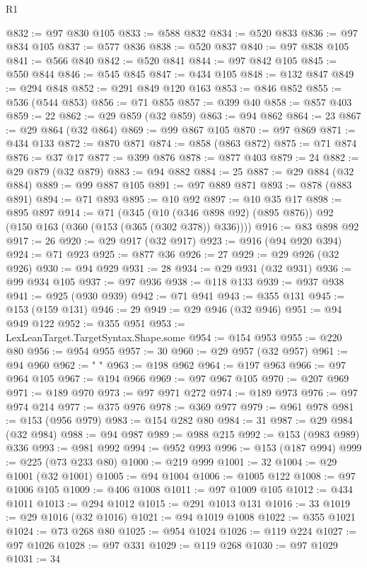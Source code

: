 \begin{lexlean}{R1}
\begin{coremodule}
@832 := @97 @830 @105
@833 := @588 @832
@834 := @520 @833
@836 := @97 @834 @105
@837 := @577 @836
@838 := @520 @837
@840 := @97 @838 @105
@841 := @566 @840
@842 := @520 @841
@844 := @97 @842 @105
@845 := @550 @844
@846 := @545 @845
@847 := @434 @105
@848 := @132 @847
@849 := @294 @848
@852 := @291 @849 @120 @163
@853 := @846 @852
@855 := @536 (@544 @853)
@856 := @71 @855
@857 := @399 @40
@858 := @857 @403
@859 := 22
@862 := @29 @859 (@32 @859)
@863 := @94 @862
@864 := 23
@867 := @29 @864 (@32 @864)
@869 := @99 @867 @105
@870 := @97 @869
@871 := @434 @133
@872 := @870 @871
@874 := @858 (@863 @872)
@875 := @71 @874
@876 := @37 @17
@877 := @399 @876
@878 := @877 @403
@879 := 24
@882 := @29 @879 (@32 @879)
@883 := @94 @882
@884 := 25
@887 := @29 @884 (@32 @884)
@889 := @99 @887 @105
@891 := @97 @889 @871
@893 := @878 (@883 @891)
@894 := @71 @893
@895 := @10 @92
@897 := @10 @35 @17
@898 := @895 @897
@914 := @71
    (@345 (@10 (@346 @898 @92) (@895 @876)) @92 (@150 @163 (@360 (@153 (@365 (@302 @378)) @336))))
@916 := @83 @898 @92
@917 := 26
@920 := @29 @917 (@32 @917)
@923 := @916 (@94 @920 @394)
@924 := @71 @923
@925 := @877 @36
@926 := 27
@929 := @29 @926 (@32 @926)
@930 := @94 @929
@931 := 28
@934 := @29 @931 (@32 @931)
@936 := @99 @934 @105
@937 := @97 @936
@938 := @118 @133
@939 := @937 @938
@941 := @925 (@930 @939)
@942 := @71 @941
@943 := @355 @131
@945 := @153 (@159 @131)
@946 := 29
@949 := @29 @946 (@32 @946)
@951 := @94 @949 @122
@952 := @355 @951
@953 := LexLeanTarget.TargetSyntax.Shape.some
@954 := @154 @953
@955 := @220 @80
@956 := @954 @955
@957 := 30
@960 := @29 @957 (@32 @957)
@961 := @94 @960
@962 := " "
@963 := @198 @962
@964 := @197 @963
@966 := @97 @964 @105
@967 := @194 @966
@969 := @97 @967 @105
@970 := @207 @969
@971 := @189 @970
@973 := @97 @971 @272
@974 := @189 @973
@976 := @97 @974 @214
@977 := @375 @976
@978 := @369 @977
@979 := @961 @978
@981 := @153 (@956 @979)
@983 := @154 @282 @80
@984 := 31
@987 := @29 @984 (@32 @984)
@988 := @94 @987
@989 := @988 @215
@992 := @153 (@983 @989) @336
@993 := @981 @992
@994 := @952 @993
@996 := @153 (@187 @994)
@999 := @225 (@73 @233 @80)
@1000 := @219 @999
@1001 := 32
@1004 := @29 @1001 (@32 @1001)
@1005 := @94 @1004
@1006 := @1005 @122
@1008 := @97 @1006 @105
@1009 := @406 @1008
@1011 := @97 @1009 @105
@1012 := @434 @1011
@1013 := @294 @1012
@1015 := @291 @1013 @131
@1016 := 33
@1019 := @29 @1016 (@32 @1016)
@1021 := @94 @1019 @1008
@1022 := @355 @1021
@1024 := @73 @268 @80
@1025 := @954 @1024
@1026 := @119 @224
@1027 := @97 @1026
@1028 := @97 @331
@1029 := @119 @268
@1030 := @97 @1029
@1031 := 34

\end{coremodule}
\end{lexlean}
